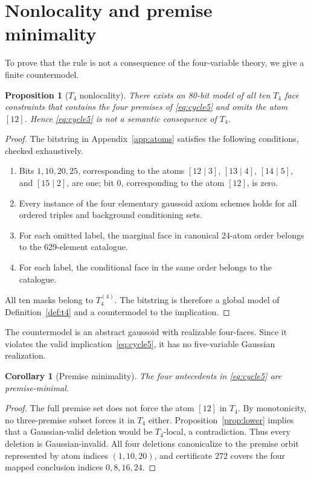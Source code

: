 \documentclass[10pt]{article}
\newtheorem{proposition}[theorem]{Proposition}
\newtheorem{corollary}[theorem]{Corollary}
\theoremstyle{definition}
\newcommand{\Tfour}{T_4}
\begin{document}
\section{Nonlocality and premise minimality}\label{sec:nonlocal}

To prove that the rule is not a consequence of the four-variable theory, we give a finite countermodel.

\begin{proposition}[$\Tfour$ nonlocality]\label{prop:nonlocal}
There exists an 80-bit model of all ten $\Tfour$ face constraints that contains the four premises of \eqref{eq:cycle5} and omits the atom $[12]$.  Hence \eqref{eq:cycle5} is not a semantic consequence of $\Tfour$.
\end{proposition}

\begin{proof}
The bitstring in Appendix~\ref{app:atoms} satisfies the following conditions, checked exhaustively.
\begin{enumerate}
 \item Bits $1,10,20,25$, corresponding to the atoms $[12\mid3]$, $[13\mid4]$, $[14\mid5]$, and $[15\mid2]$, are one; bit $0$, corresponding to the atom $[12]$, is zero.
 \item Every instance of the four elementary gaussoid axiom schemes holds for all ordered triples and background conditioning sets.
 \item For each omitted label, the marginal face in canonical 24-atom order belongs to the 629-element catalogue.
 \item For each label, the conditional face in the same order belongs to the catalogue.
\end{enumerate}
All ten masks belong to $\Tfour^{(4)}$.  The bitstring is therefore a global model of Definition~\ref{def:t4} and a countermodel to the implication.
\end{proof}

The countermodel is an abstract gaussoid with realizable four-faces.  Since it violates the valid implication~\eqref{eq:cycle5}, it has no five-variable Gaussian realization.

\begin{corollary}[Premise minimality]\label{cor:minimal}
The four antecedents in \eqref{eq:cycle5} are premise-minimal.
\end{corollary}

\begin{proof}
The full premise set does not force the atom $[12]$ in $\Tfour$.  By monotonicity, no three-premise subset forces it in $\Tfour$ either.  Proposition~\ref{prop:lower} implies that a Gaussian-valid deletion would be $\Tfour$-local, a contradiction.  Thus every deletion is Gaussian-invalid.  All four deletions canonicalize to the premise orbit represented by atom indices $(1,10,20)$, and certificate 272 covers the four mapped conclusion indices $0,8,16,24$.
\end{proof}
\end{document}
